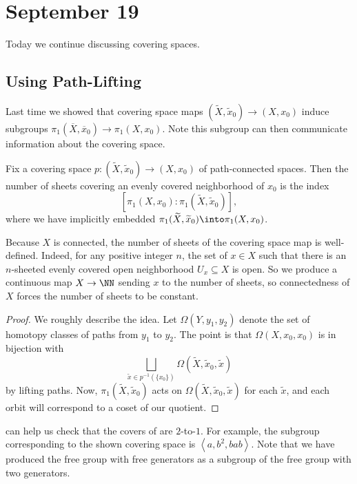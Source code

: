 \documentclass[../notes.tex]{subfiles}
\begin{document}
\section{September 19}

Today we continue discussing covering spaces.

\subsection{Using Path-Lifting}
Last time we showed that covering space maps $(\widetilde X,\widetilde x_0)\to(X,x_0)$ induce subgroups $\pi_1(\overline X,\overline x_0)\to\pi_1(X,x_0)$. Note this subgroup can then communicate information about the covering space.
\begin{proposition} \label{prop:index-of-covering}
	Fix a covering space $p\colon(\widetilde X,\widetilde x_0)\to (X,x_0)$ of path-connected spaces. Then the number of sheets covering an evenly covered neighborhood of $x_0$ is the index
	\[\left[\pi_1(X,x_0):\pi_1(\widetilde X,\widetilde x_0)\right],\]
	where we have implicitly embedded $\pi_1(\widetilde X,\widetilde x_0)\into\pi_1(X,x_0)$.
\end{proposition}
\begin{remark}
	Because $X$ is connected, the number of sheets of the covering space map is well-defined. Indeed, for any positive integer $n$, the set of $x\in X$ such that there is an $n$-sheeted evenly covered open neighborhood $U_x\subseteq X$ is open. So we produce a continuous map $X\to\NN$ sending $x$ to the number of sheets, so connectedness of $X$ forces the number of sheets to be constant.
\end{remark}
\begin{proof}
	We roughly describe the idea. Let $\Omega(Y,y_1,y_2)$ denote the set of homotopy classes of paths from $y_1$ to $y_2$. The point is that $\Omega(X,x_0,x_0)$ is in bijection with
	\[\bigsqcup_{\widetilde x\in p^{-1}(\{x_0\})}\Omega(\widetilde X,\widetilde x_0,\widetilde x)\]
	by lifting paths. Now, $\pi_1(\widetilde X,\widetilde x_0)$ acts on $\Omega(\widetilde X,\widetilde x_0,\widetilde x)$ for each $\widetilde x$, and each orbit will correspond to a coset of our quotient.
\end{proof}
\begin{remark}
	 can help us check that the covers of  are $2$-to-$1$. For example, the subgroup corresponding to the shown covering space is $\left\langle a,b^2,bab\right\rangle$. Note that we have produced the free group with free generators as a subgroup of the free group with two generators.
\end{remark}
\end{document}
